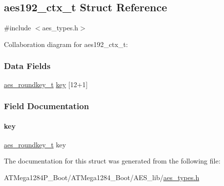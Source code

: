 \hypertarget{structaes192__ctx__t}{}\subsection{aes192\+\_\+ctx\+\_\+t Struct Reference}
\label{structaes192__ctx__t}


{\ttfamily \#include $<$aes\+\_\+types.\+h$>$}



Collaboration diagram for aes192\+\_\+ctx\+\_\+t\+:
\subsubsection*{Data Fields}
\begin{DoxyCompactItemize}
\item 
\hyperlink{structaes__roundkey__t}{aes\+\_\+roundkey\+\_\+t} \hyperlink{structaes192__ctx__t_ae1daf2d5d216f88f485609305b8affb7}{key} \mbox{[}12+1\mbox{]}
\end{DoxyCompactItemize}


\subsubsection{Field Documentation}
\mbox{\label{structaes192__ctx__t_ae1daf2d5d216f88f485609305b8affb7}} 
\paragraph{\texorpdfstring{key}{key}}
{\footnotesize\ttfamily \hyperlink{structaes__roundkey__t}{aes\+\_\+roundkey\+\_\+t} key}



The documentation for this struct was generated from the following file\+:\begin{DoxyCompactItemize}
\item 
A\+T\+Mega1284\+P\+\_\+\+Boot/\+A\+T\+Mega1284\+\_\+\+Boot/\+A\+E\+S\+\_\+lib/\hyperlink{_a_t_mega1284_p___boot_2_a_t_mega1284___boot_2_a_e_s__lib_2aes__types_8h}{aes\+\_\+types.\+h}\end{DoxyCompactItemize}
